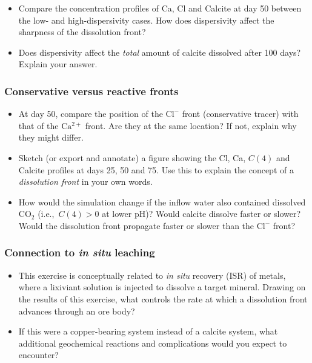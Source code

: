 \begin{itemize}

\item Compare the concentration profiles of Ca, Cl and Calcite at day
50 between the low- and high-dispersivity cases.
How does dispersivity affect the sharpness of the dissolution front?

\item Does dispersivity affect the \textit{total} amount of calcite
dissolved after 100 days?  Explain your answer.

\end{itemize}

\subsubsection*{Conservative versus reactive fronts}

\begin{itemize}

\item At day 50, compare the position of the $\mathrm{Cl^-}$ front
(conservative tracer) with that of the $\mathrm{Ca^{2+}}$ front.
Are they at the same location?  If not, explain why they might differ.

\item Sketch (or export and annotate) a figure showing the Cl, Ca, $C(4)$
and Calcite profiles at days 25, 50 and 75.
Use this to explain the concept of a \textit{dissolution front} in your
own words.

\item How would the simulation change if the inflow water also contained
dissolved $\mathrm{CO_2}$ (i.e.,\ $C(4) > 0$ at lower pH)?
Would calcite dissolve faster or slower?
Would the dissolution front propagate faster or slower than the
$\mathrm{Cl^-}$ front?

\end{itemize}

\subsubsection*{Connection to \textit{in situ} leaching}

\begin{itemize}

\item This exercise is conceptually related to \textit{in situ} recovery
(ISR) of metals, where a lixiviant solution is injected to dissolve a
target mineral. Drawing on the results of this exercise, what controls the rate at which a dissolution front advances through an ore body?

\item If this were a copper-bearing system instead of a calcite system,
what additional geochemical reactions and complications would you expect
to encounter?

\end{itemize}

% 
